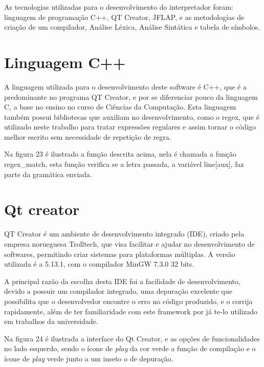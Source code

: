 \documentclass[12pt,oneside,a4paper,chapter=TITLE,section=TITLE,sumario=tradicional]{abntex2}
\begin{document}
As tecnologias utilizadas para o desenvolvimento do interpretador foram: linguagem de programação C++, QT Creator, JFLAP, e as metodologias de criação de um compilador, Análise Léxica, Análise Sintática e tabela de símbolos.  

\section{Linguagem C++}
\label{sec:linugagemc++}

A linguagem utilizada para o desenvolvimento deste software é C++, que é a predominante no programa QT Creator, e por se diferenciar pouco da linguagem C, a base no ensino no curso de Ciências da Computação. Esta linguagem também possui bibliotecas que auxiliam no desenvolvimento, como o regex, que é utilizado neste trabalho para tratar expressões regulares e assim tornar o código melhor escrito sem necessidade de repetição de regra.

Na figura 23 é ilustrado a função descrita acima, nela é chamada a função regex\_match, esta função verifica se a letra passada, a variável line[aux], faz parte da gramática enviada.

\begin{figure}[htb]
\end{figure} 

\section{Qt creator}
\label{sec:qtcreator}

QT Creator é um ambiente de desenvolvimento integrado (IDE), criado pela empresa norueguesa Trolltech, que visa facilitar e ajudar no desenvolvimento de softwares, permitindo criar sistemas para plataformas múltiplas. A versão utilizada é a 5.13.1, com o compilador MinGW 7.3.0 32 bits. 

A principal razão da escolha desta IDE foi a facilidade de desenvolvimento, devido a possuir um compilador integrado, uma depuração excelente que possibilita que o desenvolvedor encontre o erro no código produzido, e o corrija rapidamente, além de ter familiaridade com este framework por já te-lo utilizado em trabalhos da universidade. 

Na figura 24 é ilustrada a interface do Qt Creator, e as opções de funcionalidades no lado esquerdo, sendo o ícone de \textit{play} da cor verde a função de compilação e o ícone de \textit{play} verde junto a um inseto o de depuração.
\end{document}
